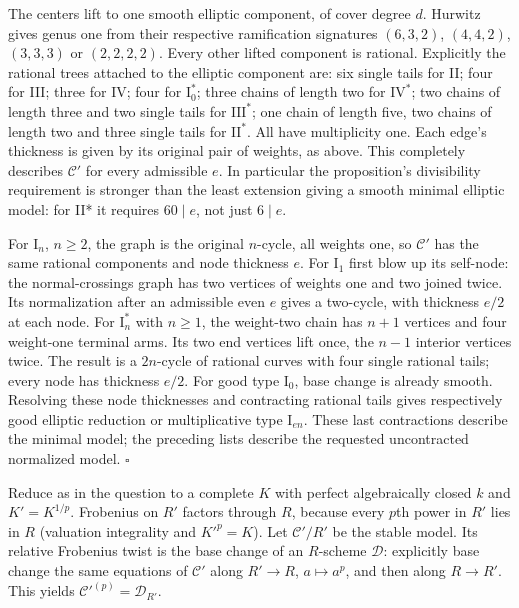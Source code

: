 \documentclass[11pt]{article}
\let\chapterexercise\exercise
\renewcommand{\exercise}[2]{\Needspace{8\baselineskip}\chapterexercise{#1}{#2}}
\begin{document}
The centers lift to one smooth elliptic component, of cover degree $d$. Hurwitz gives genus one from their respective ramification signatures $(6,3,2)$, $(4,4,2)$, $(3,3,3)$ or $(2,2,2,2)$. Every other lifted component is rational. Explicitly the rational trees attached to the elliptic component are: six single tails for II; four for III; three for IV; four for $\mathrm I_0^*$; three chains of length two for $\mathrm{IV}^*$; two chains of length three and two single tails for $\mathrm{III}^*$; one chain of length five, two chains of length two and three single tails for $\mathrm{II}^*$. All have multiplicity one. Each edge's thickness is given by its original pair of weights, as above. This completely describes $\mathcal C'$ for every admissible $e$. In particular the proposition's divisibility requirement is stronger than the least extension giving a smooth minimal elliptic model: for II* it requires $60\mid e$, not just $6\mid e$.

For $\mathrm I_n$, $n\ge2$, the graph is the original $n$-cycle, all weights one, so $\mathcal C'$ has the same rational components and node thickness $e$. For $\mathrm I_1$ first blow up its self-node: the normal-crossings graph has two vertices of weights one and two joined twice. Its normalization after an admissible even $e$ gives a two-cycle, with thickness $e/2$ at each node. For $\mathrm I_n^*$ with $n\ge1$, the weight-two chain has $n+1$ vertices and four weight-one terminal arms. Its two end vertices lift once, the $n-1$ interior vertices twice. The result is a $2n$-cycle of rational curves with four single rational tails; every node has thickness $e/2$. For good type $\mathrm I_0$, base change is already smooth. Resolving these node thicknesses and contracting rational tails gives respectively good elliptic reduction or multiplicative type $\mathrm I_{en}$. These last contractions describe the minimal model; the preceding lists describe the requested uncontracted normalized model. \hfill$\square$

\pf Reduce as in the question to a complete $K$ with perfect algebraically closed $k$ and $K'=K^{1/p}$. Frobenius on $R'$ factors through $R$, because every $p$th power in $R'$ lies in $R$ (valuation integrality and $K'^p=K$). Let $\mathcal C'/R'$ be the stable model. Its relative Frobenius twist is the base change of an $R$-scheme $\mathcal D$: explicitly base change the same equations of $\mathcal C'$ along $R'\to R$, $a\mapsto a^p$, and then along $R\to R'$. This yields $\mathcal C'^{(p)}=\mathcal D_{R'}$.
\end{document}
